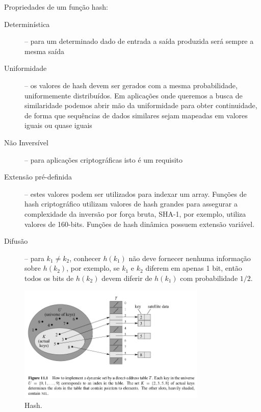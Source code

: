 \begin{frame}
\framebreak

Propriedades de um função hash:
\begin{description}
\item[Determinística] -- para um determinado dado de entrada a saída produzida será sempre a mesma saída
\item[Uniformidade] -- os valores de hash devem ser gerados com a mesma probabilidade, uniformemente distribuídos. 
Em aplicações onde queremos a busca de similaridade podemos abrir mão da uniformidade para obter continuidade,
de forma que sequências de dados similares sejam mapeadas em valores iguais ou quase iguais
\item[Não Inversível] -- para aplicações criptográficas isto é um requisito
\item[Extensão pré-definida] -- estes valores podem ser utilizados para indexar um array. 
Funções de hash criptográfico utilizam valores de hash grandes para assegurar a complexidade
da inversão por força bruta, SHA-1, por exemplo, utiliza valores de 160-bits.
Funções de hash dinâmica possuem extensão variável.
\item[Difusão] -- para $k_1 \neq k_2$, conhecer $h(k_1)$ não deve fornecer nenhuma informação sobre $h(k_2)$,
por exemplo, se $k_1$ e $k_2$ diferem em apenas 1 bit, então todos os bits de $h(k_2)$ devem diferir
de $h(k_1)$ com probabilidade $1/2$.
\end{description}

\framebreak

  \begin{figure}[h!]
  \centering
  \includegraphics[width=0.8\textwidth,height=0.7\textheight,keepaspectratio]{figures/hash-fig111.png}
  \caption{Hash.}
  \label{fig:hash-fig111}
  \end{figure}

\framebreak


\end{frame}
